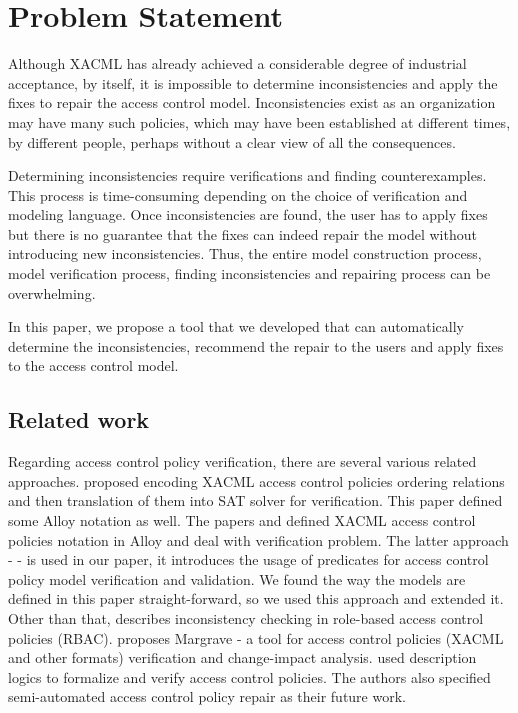 \documentclass{acm_proc_article-sp}
\begin{document}
\section{Problem Statement}

Although XACML has already achieved a considerable degree of industrial acceptance, by itself, it is impossible to determine inconsistencies and apply the fixes to repair the access control model. Inconsistencies exist as an organization may have many such policies, which may have been established at different times, by different people, perhaps without a clear view of all the consequences. 

Determining inconsistencies require verifications and finding counterexamples. This process is time-consuming depending on the choice of verification and modeling language. Once inconsistencies are found, the user has to apply fixes but there is no guarantee that the fixes can indeed repair the model without introducing new inconsistencies. Thus, the entire model construction process, model verification process, finding inconsistencies and repairing process can be overwhelming.

In this paper, we propose a tool that we developed that can automatically determine the inconsistencies, recommend the repair to the users and apply fixes to the access control model.

\subsection{Related work}

Regarding access control policy verification, there are several various related approaches.
\cite{Hughes:2008:AVA:1459278.1459282} proposed encoding XACML access control policies  ordering relations and then translation of them into SAT solver for verification. This paper defined some Alloy notation as well.  The papers \cite{acp:automated} and \cite{acp:alloy} defined XACML access control policies notation in Alloy and deal with verification problem. The latter approach - \cite{acp:alloy} - is used in our paper, it introduces the usage of predicates for access control policy model verification and validation. We found the way the models are defined in this paper straight-forward, so we used this approach and extended it. Other than that, \cite{4258517} describes inconsistency checking in role-based access control policies (RBAC). \cite{Fisler:2005:VCA:1062455.1062502} proposes Margrave - a tool for access control policies (XACML and other formats) verification and change-impact analysis. \cite {acp:descriptionlogics} used description logics to formalize and verify access control policies. The authors also specified semi-automated access control policy repair as their future work.
\end{document}
